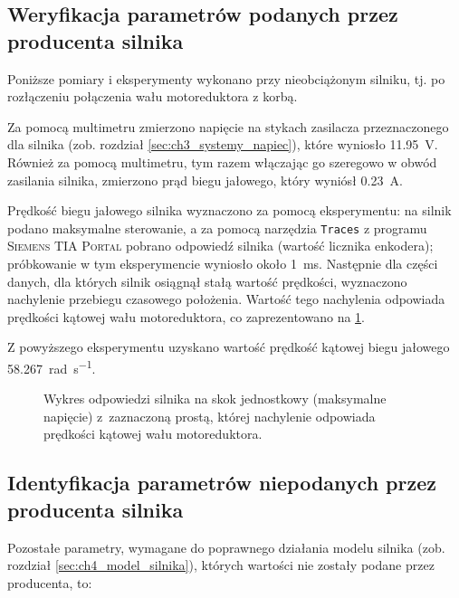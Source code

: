 \subsection{Weryfikacja parametrów podanych przez producenta silnika}
\label{subsec:ch5_weryfikacja_parametrow_producenta_silnika}

Poniższe pomiary i eksperymenty wykonano przy nieobciążonym silniku, tj. po rozłączeniu połączenia wału motoreduktora z korbą.

Za pomocą multimetru zmierzono napięcie na stykach zasilacza przeznaczonego dla silnika (zob. rozdział \ref{sec:ch3_systemy_napiec}), które wyniosło \SI{11,95}{\volt}. Również za pomocą multimetru, tym razem włączając go szeregowo w obwód zasilania silnika, zmierzono prąd biegu jałowego, który wyniósł \SI{0,23}{\ampere}.

Prędkość biegu jałowego silnika wyznaczono za pomocą eksperymentu: na silnik podano maksymalne sterowanie, a za pomocą narzędzia \texttt{Traces} z programu \textsc{Siemens TIA Portal} pobrano odpowiedź silnika (wartość licznika enkodera); próbkowanie w tym eksperymencie wyniosło około \SI{1}{\milli\second}. Następnie dla części danych, dla których silnik osiągnął stałą wartość prędkości, wyznaczono nachylenie przebiegu czasowego położenia. Wartość tego nachylenia odpowiada prędkości kątowej wału motoreduktora, co zaprezentowano na \cref{fig:odpowiedz_silnika_na_maksymalny_skok_jednostkowy}.

Z powyższego eksperymentu uzyskano wartość prędkość kątowej biegu jałowego \SI[per-mode=fraction]{58,267}{\radian\per\second}.

\begin{figure}[h]
    \centering
    
    \caption{Wykres odpowiedzi silnika na skok jednostkowy (maksymalne napięcie) z~zaznaczoną prostą, której nachylenie odpowiada prędkości kątowej wału motoreduktora.}
    \label{fig:odpowiedz_silnika_na_maksymalny_skok_jednostkowy}
\end{figure}

\subsection{Identyfikacja parametrów niepodanych przez producenta silnika}
\label{subsec:ch5_identyfikacja_parametrow_niepodanych_przez_producenta_silnika}

Pozostałe parametry, wymagane do poprawnego działania modelu silnika (zob. rozdział \ref{sec:ch4_model_silnika}), których wartości nie zostały podane przez producenta, to:

